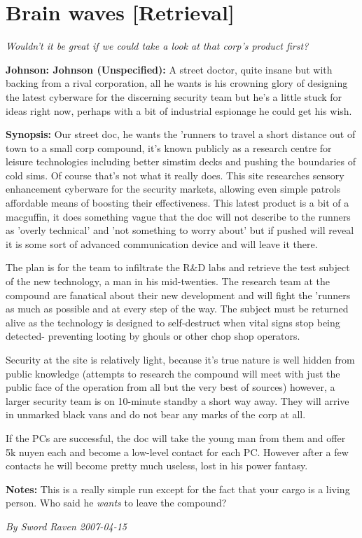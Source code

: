 \documentclass[letterpaper,twocolumn,10.5pt]{article}
\newenvironment{scenario}[6]
	{
		\section{#1 {\small[#2]}}
		\textit{#3}
		\def\TMPSCENARIO{#4 #5}
	}
	{\small\textit{By \TMPSCENARIO}}
\newcommand{\johnson}[2]{\textbf{Johnson: #1 (#2):}}
\newcommand{\synopsis}{\textbf{Synopsis: }}
\newcommand{\notes}{\textbf{Notes: }}
\begin{document}
\begin{scenario}{Brain waves}
	{Retrieval}
	{ Wouldn't it be great if we could take a look at that corp's product first?}
	{Sword Raven}
	{2007-04-15}
	{https://forum.rpg.net/showthread.php?321504-Shadowrun-4th-101-Instant-Scenarios\&p=7173237#post7173237}

\johnson{Johnson}{Unspecified}  A street doctor, quite insane but with backing from a rival corporation, all he wants is his crowning glory of designing the latest cyberware for the discerning security team but he's a little stuck for ideas right now, perhaps with a bit of industrial espionage he could get his wish.

\synopsis Our street doc, he wants the 'runners to travel a short distance out of town to a small corp compound, it's known publicly as a research centre for leisure technologies including better simstim decks and pushing the boundaries of cold sims. Of course that's not what it really does. This site researches sensory enhancement cyberware for the security markets, allowing even simple patrols affordable means of boosting their effectiveness. This latest product is a bit of a macguffin, it does something vague that the doc will not describe to the runners as 'overly technical' and 'not something to worry about' but if pushed will reveal it is some sort of advanced communication device and will leave it there.

The plan is for the team to infiltrate the R\&D labs and retrieve the test subject of the new technology, a man in his mid-twenties. The research team at the compound are fanatical about their new development and will fight the 'runners as much as possible and at every step of the way. The subject must be returned alive as the technology is designed to self-destruct when vital signs stop being detected- preventing looting by ghouls or other chop shop operators.

Security at the site is relatively light, because it's true nature is well hidden from public knowledge (attempts to research the compound will meet with just the public face of the operation from all but the very best of sources) however, a larger security team is on 10-minute standby a short way away. They will arrive in unmarked black vans and do not bear any marks of the corp at all.

If the PCs are successful, the doc will take the young man from them and offer 5k nuyen each and become a low-level contact for each PC. However after a few contacts he will become pretty much useless, lost in his power fantasy.

\notes This is a really simple run except for the fact that your cargo is a living person. Who said he \textit{wants} to leave the compound? 

\end{scenario}
\end{document}
